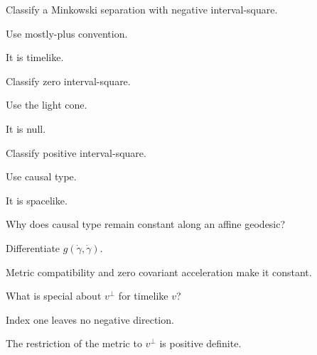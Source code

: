 \begin{exercise}\label{exr:vii30-12}
Classify a Minkowski separation with negative interval-square.
\end{exercise}
\begin{hint}
Use mostly-plus convention.
\end{hint}
\begin{solution}
It is timelike.
\end{solution}

\begin{exercise}\label{exr:vii30-13}
Classify zero interval-square.
\end{exercise}
\begin{hint}
Use the light cone.
\end{hint}
\begin{solution}
It is null.
\end{solution}

\begin{exercise}\label{exr:vii30-14}
Classify positive interval-square.
\end{exercise}
\begin{hint}
Use causal type.
\end{hint}
\begin{solution}
It is spacelike.
\end{solution}

\begin{exercise}\label{exr:vii30-15}
Why does causal type remain constant along an affine geodesic?
\end{exercise}
\begin{hint}
Differentiate \(g(\dot\gamma,\dot\gamma)\).
\end{hint}
\begin{solution}
Metric compatibility and zero covariant acceleration make it constant.
\end{solution}

\begin{exercise}\label{exr:vii30-16}
What is special about \(v^\perp\) for timelike \(v\)?
\end{exercise}
\begin{hint}
Index one leaves no negative direction.
\end{hint}
\begin{solution}
The restriction of the metric to \(v^\perp\) is positive definite.
\end{solution}

